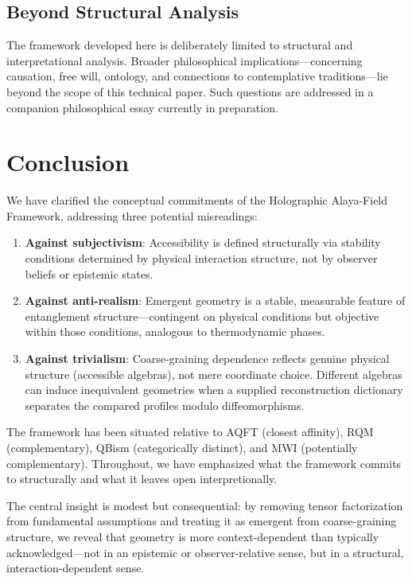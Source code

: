 \documentclass[12pt,a4paper,openany]{book}
\begin{document}
\subsection{Beyond Structural Analysis}

The framework developed here is deliberately limited to structural and interpretational analysis. Broader philosophical implications—concerning causation, free will, ontology, and connections to contemplative traditions—lie beyond the scope of this technical paper. Such questions are addressed in a companion philosophical essay currently in preparation.

\section{Conclusion}

We have clarified the conceptual commitments of the Holographic Alaya-Field Framework, addressing three potential misreadings:

\begin{enumerate}
\item \textbf{Against subjectivism}: Accessibility is defined structurally via stability conditions determined by physical interaction structure, not by observer beliefs or epistemic states.

\item \textbf{Against anti-realism}: Emergent geometry is a stable, measurable feature of entanglement structure—contingent on physical conditions but objective within those conditions, analogous to thermodynamic phases.

\item \textbf{Against trivialism}: Coarse-graining dependence reflects genuine physical structure (accessible algebras), not mere coordinate choice. Different algebras can induce inequivalent geometries when a supplied reconstruction dictionary separates the compared profiles modulo diffeomorphisms.
\end{enumerate}

The framework has been situated relative to AQFT (closest affinity), RQM (complementary), QBism (categorically distinct), and MWI (potentially complementary). Throughout, we have emphasized what the framework commits to structurally and what it leaves open interpretionally.

The central insight is modest but consequential: by removing tensor factorization from fundamental assumptions and treating it as emergent from coarse-graining structure, we reveal that geometry is more context-dependent than typically acknowledged—not in an epistemic or observer-relative sense, but in a structural, interaction-dependent sense.
\end{document}
